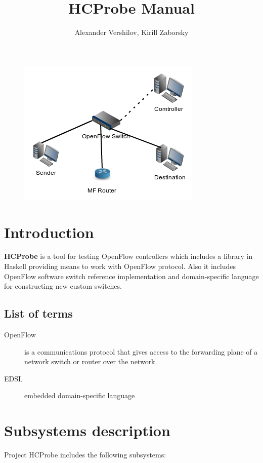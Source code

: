 \documentclass[9pt,a4paper]{article}
\title{HCProbe Manual}
\author{Alexander Vershilov, Kirill Zaborsky}
\begin{document}
\maketitle
\begin{figure}[!h]
   \centering 
   \includegraphics[width=0.3\columnwidth]{images/testcfg2.png}
\end{figure}                                                        

\tableofcontents

\pagebreak

\section{Introduction}

\textbf{HCProbe} is a tool for testing OpenFlow controllers which
includes a library in Haskell providing means to work with OpenFlow
protocol. Also it includes OpenFlow software switch reference
implementation and domain-specific language for constructing new
custom switches.

\subsection{List of terms}

\begin{description}
  \item[OpenFlow] is a communications protocol that gives access to
    the forwarding plane of a network switch or router over the
    network.
  \item[EDSL] embedded domain-specific language
\end{description}

\pagebreak

\section{Subsystems description}

Project HCProbe includes the following subsystems:
\end{document}
